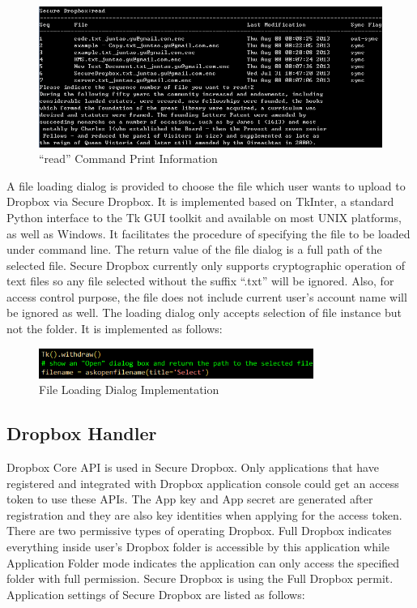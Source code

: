 \begin{figure}[h]
        \centering
        \includegraphics[width=1.0\textwidth]{figures/read_Command_Print_Information.png}
        \caption[Command Print Information II] {``read'' Command Print Information}
\end{figure}

A file loading dialog is provided to choose the file which user wants to upload to Dropbox via Secure Dropbox. It is implemented based on TkInter, a standard Python interface to the Tk GUI toolkit and available on most UNIX platforms, as well as Windows. It facilitates the procedure of specifying the file to be loaded under command line. The return value of the file dialog is a full path of the selected file. Secure Dropbox currently only supports cryptographic operation of text files so any file selected without the suffix “.txt” will be ignored. Also, for access control purpose, the file does not include current user’s account name will be ignored as well. The loading dialog only accepts selection of file instance but not the folder. It is implemented as follows:

\begin{figure}[h]
        \centering
        \includegraphics[width=0.8\textwidth]{figures/File_Dialog_Implementation.png}
        \caption[File Dialog Implementation] {File Loading Dialog Implementation}
\end{figure}

\subsection{Dropbox Handler}
Dropbox Core API is used in Secure Dropbox. Only applications that have registered and integrated with Dropbox application console could get an access token to use these APIs. The App key and App secret are generated after registration and they are also key identities when applying for the access token. There are two permissive types of operating Dropbox. Full Dropbox indicates everything inside user’s Dropbox folder is accessible by this application while Application Folder mode indicates the application can only access the specified folder with full permission. Secure Dropbox is using the Full Dropbox permit. Application settings of Secure Dropbox are listed as follows:

